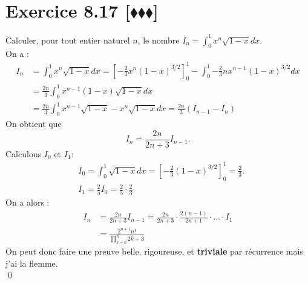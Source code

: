 \documentclass[10pt]{article}
\begin{document}
\section*{Exercice 8.17 [$\blacklozenge\blacklozenge\blacklozenge$]}
\begin{tcolorbox}[enhanced, width=7in, center, size=fbox, fontupper=\large, drop shadow southwest]
    Calculer, pour tout entier naturel $n$, le nombre $I_n=\int_0^1{x^n\sqrt{1-x}dx}$.\\
    On a :
    \begin{align*}
        I_n &= \int_0^1x^n\sqrt{1-x}dx=\left[-\frac{2}{3}x^n(1-x)^{3/2}\right]_0^1-\int_0^1{-\frac{2}{3}nx^{n-1}(1-x)^{3/2}dx}\\
        &=\frac{2n}{3}\int_0^1{x^{n-1}(1-x)\sqrt{1-x}dx}\\
        &=\frac{2n}{3}\int_0^1{x^{n-1}\sqrt{1-x} - x^n\sqrt{1-x}dx} = \frac{2n}{3}(I_{n-1} - I_n)
    \end{align*}
    On obtient que
    \begin{equation*}
        I_n = \frac{2n}{2n+3}I_{n-1}.
    \end{equation*}
    Calculons $I_0$ et $I_1$:
    \begin{align*}
        &I_0 = \int_0^1{\sqrt{1-x}dx} = \left[-\frac{2}{3}(1-x)^{3/2}\right]_0^1 = \frac{2}{3}.\\
        &I_1 = \frac{2}{5}I_0 = \frac{2}{5}\cdot\frac{2}{3}
    \end{align*}
    On a alors :
    \begin{align*}
        I_n &= \frac{2n}{2n+3}I_{n-1} = \frac{2n}{2n+3}\cdot\frac{2(n-1)}{2n+1}\cdot...\cdot I_1\\
        &= \frac{2^{n+1}n!}{\prod\limits_{k=0}^{n}{2k+3}}
    \end{align*}
    On peut donc faire une preuve belle, rigoureuse, et \textbf{triviale} par récurrence mais j'ai la flemme.\\
    \qed
\end{tcolorbox}

\end{document}
